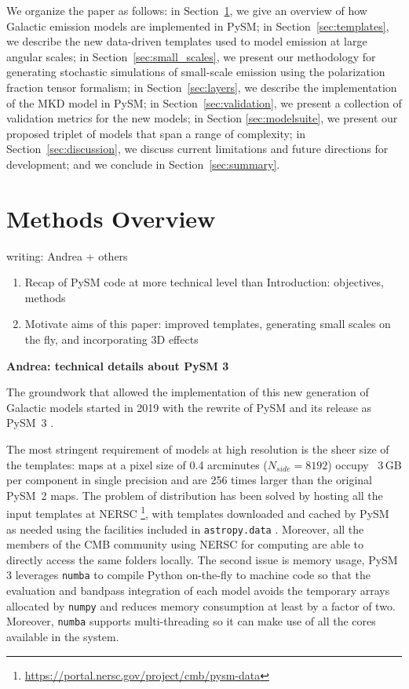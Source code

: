 \documentclass[twocolumn]{aastex631}
\begin{document}
We organize the paper as follows: in Section~\ref{sec:methods}, we give an overview of how Galactic emission models are implemented in PySM; in Section~\ref{sec:templates}, we describe the new data-driven templates used to model emission at large angular scales; in Section~\ref{sec:small_scales}, we present our methodology for generating stochastic simulations of small-scale emission using the polarization fraction tensor formalism; in Section~\ref{sec:layers}, we describe the implementation of the MKD model in PySM; in Section~\ref{sec:validation}, we present a collection of validation metrics for the new models; in Section \ref{sec:modelsuite}, we present our proposed triplet of models that span a range of complexity; in Section~\ref{sec:discussion}, we discuss current limitations and future directions for development; and we conclude in Section~\ref{sec:summary}.

\section{Methods Overview} \label{sec:methods}
writing: Andrea + others

\begin{enumerate}
    \item Recap of PySM code at more technical level than Introduction: objectives, methods
    \item Motivate aims of this paper: improved templates, generating small scales on the fly, and incorporating 3D effects
\end{enumerate}

\textbf{Andrea: technical details about PySM 3}

The groundwork that allowed the implementation of this new generation of Galactic models started in 2019 with the rewrite of PySM and its release as PySM~3 \citep[see][for details]{Zonca:2021}.

The most stringent requirement of models at high resolution is the sheer size of the templates: maps at a pixel size of 0.4 arcminutes ($N_{side}=8192$) occupy ~3\,GB per component in single precision and are 256 times larger than the original PySM~2 maps. The problem of distribution has been solved by hosting all the input templates at NERSC \footnote{\url{https://portal.nersc.gov/project/cmb/pysm-data}}, with templates downloaded and cached by PySM as needed using the facilities included in \texttt{astropy.data} \citep{AstropyCollaboration:2013, AstropyCollaboration:2018}. Moreover, all the members of the CMB community using NERSC for computing are able to directly access the same folders locally. The second issue is memory usage, PySM 3 leverages \texttt{numba} \citep{numba:2015} to compile Python on-the-fly to machine code so that the evaluation and bandpass integration of each model avoids the temporary arrays allocated by \texttt{numpy} and reduces memory consumption at least by a factor of two. Moreover, \texttt{numba} supports multi-threading so it can make use of all the cores available in the system.
\end{document}

